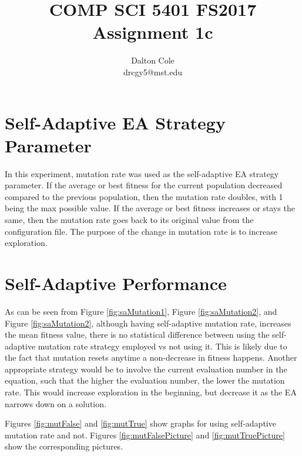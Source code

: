 \documentclass[times]{article}
\begin{document}
	\title{COMP SCI 5401 FS2017 Assignment 1c}
	\author{Dalton Cole \\ drcgy5@mst.edu}
	\date{}
	\maketitle

	\section{Self-Adaptive EA Strategy Parameter}
	In this experiment, mutation rate was used as the self-adaptive EA strategy parameter. If the average or best fitness for the current population decreased compared to the previous population, then the mutation rate doubles, with 1 being the max possible value. If the average or best fitness increases or stays the same, then the mutation rate goes back to its original value from the configuration file. The purpose of the change in mutation rate is to increase exploration. 

	\section{Self-Adaptive Performance}
	As can be seen from Figure \ref{fig:saMutation1}, Figure \ref{fig:saMutation2}, and Figure \ref{fig:saMutation2}, although having self-adaptive mutation rate, increases the mean fitness value, there is no statistical difference between using the self-adaptive mutation rate strategy employed vs not using it. This is likely due to the fact that mutation resets anytime a non-decrease in fitness happens. Another appropriate strategy would be to involve the current evaluation number in the equation, such that the higher the evaluation number, the lower the mutation rate. This would increase exploration in the beginning, but decrease it as the EA narrows down on a solution.

	Figures \ref{fig:mutFalse} and \ref{fig:mutTrue} show graphs for using self-adaptive mutation rate and not. Figures \ref{fig:mutFalsePicture} and \ref{fig:mutTruePicture} show the corresponding pictures.
\end{document}
